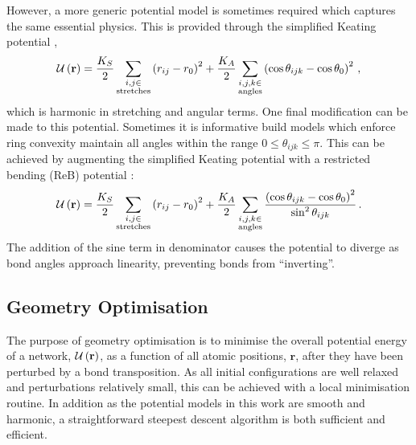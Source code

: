 However, a more generic potential model is sometimes required which captures the same essential physics.
This is provided through the simplified Keating potential \cite{VonAlfthan2003},
\begin{equation}
	\mathcal{U}\left(\mathbf{r}\right) = \frac{K_S}{2}\sum_{\substack{i,j\in \\ \text{stretches}}}\left(r_{ij}-r_0\right)^2 + \frac{K_A}{2}\sum_{\substack{i,j,k \in \\ \text{angles}}} \left(\cos\theta_{ijk}-\cos\theta_0\right)^2\,,
\end{equation}
which is harmonic in stretching and angular terms.
One final modification can be made to this potential. 
Sometimes it is informative build models which enforce ring convexity \ie{} maintain all angles within the range $0\leq \theta_{ijk} \leq \pi$.
This can be achieved by augmenting the simplified Keating potential with a restricted bending (ReB) potential \cite{Bulacu2013}:
\begin{equation}
	\mathcal{U}\left(\mathbf{r}\right) = \frac{K_S}{2}\sum_{\substack{i,j\in \\ \text{stretches}}}\left(r_{ij}-r_0\right)^2 + \frac{K_A}{2}\sum_{\substack{i,j,k \in \\ \text{angles}}} \frac{\left(\cos\theta_{ijk}-\cos\theta_0\right)^2}{\sin^{2}\theta_{ijk}}\,.
\end{equation}
The addition of the sine term in denominator causes the potential to diverge as bond angles approach linearity, preventing bonds from ``inverting''.

\subsection{Geometry Optimisation}
\label{s:geomopt}

The purpose of geometry optimisation is to minimise the overall potential energy of a network, $\mathcal{U}\left(\mathbf{r}\right)$, as a function of all atomic positions, $\mathbf{r}$, after they have been perturbed \eg{} by a bond transposition.
As all initial configurations are well relaxed and perturbations relatively small, this can be achieved with a local minimisation routine.
In addition as the potential models in this work are smooth and harmonic, a straightforward steepest descent algorithm is both sufficient and efficient.

